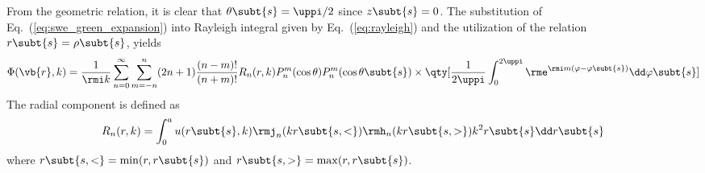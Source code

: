 From the geometric relation, it is clear that $\theta\subt{s} = \uppi/2$ since $z\subt{s} = 0$.
The substitution of Eq.~(\ref{eq:swe_green_expansion}) into Rayleigh integral given by Eq.~(\ref{eq:rayleigh}) and the utilization of the relation $r\subt{s} = \rho\subt{s}$, yields
\begin{dmath}
    \Phi(\vb{r},k)
  =
  \frac{1}{\rmi k}
  \sum_{n=0}^\infty 
  \sum_{m=-n}^n
  (2n+1)\frac{(n-m)!}{(n+m)!}
  R_n(r,k)
  P_n^m(\cos\theta)
  P_n^m(\cos\theta\subt{s})
  \\
  \times
  \qty[\frac{1}{2\uppi}\int_0^{2\uppi}\rme^{\rmi m (\varphi-\varphi\subt{s})}\dd \varphi\subt{s}]
  \label{eq:swe:we09fjs}
\end{dmath}
The radial component is defined as
\begin{equation}
    R_n(r,k) = 
    \int_0^a u(r\subt{s},k)
    \rmj_n(kr\subt{s,<})
    \rmh_n(kr\subt{s,>})
    k^2 r\subt{s}\dd r\subt{s}
    \label{eq:swe:radial_comp}
\end{equation}
where $r\subt{s,<} = \min(r,r\subt{s})$ and $r\subt{s,>} = \max(r,r\subt{s})$.

